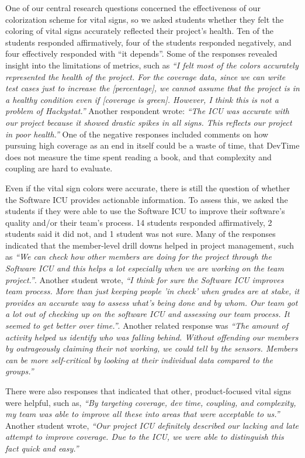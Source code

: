 \documentclass[times,10pt,twocolumn]{article}
\begin{document}
One of our central research questions concerned the effectiveness of our
colorization scheme for vital signs, so we asked students whether they felt
the coloring of vital signs accurately reflected their project's health.
Ten of the students responded affirmatively, four of the students responded
negatively, and four effectively responded with ``it depends''.  Some of
the responses revealed insight into the limitations of metrics, such as
{\em ``I felt most of the colors accurately represented the health of the
project. For the coverage data, since we can write test cases just to
increase the [percentage], we cannot assume that the project is in a
healthy condition even if [coverage is green]. However, I think this is not
a problem of Hackystat.''}  Another respondent wrote: {\em ``The ICU was
accurate with our project because it showed drastic spikes in all signs.
This reflects our project in poor health.''}  One of the negative responses
included comments on how pursuing high coverage as an end in itself could
be a waste of time, that DevTime does not measure the time spent reading a
book, and that complexity and coupling are hard to evaluate.

Even if the vital sign colors were accurate, there is still the question of
whether the Software ICU provides actionable information. To assess this,
we asked the students if they were able to use the Software ICU to improve
their software's quality and/or their team's process.  14 students
responded affirmatively, 2 students said it did not, and 1 student was not
sure.  Many of the responses indicated that the member-level drill downs
helped in project management, such as {\em ``We can check how other members
are doing for the project through the Software ICU and this helps a lot
especially when we are working on the team project.''}.  Another student
wrote, {\em ``I think for sure the Software ICU improves team process. More
than just keeping people 'in check' when grades are at stake, it
provides an accurate way to assess what's being done and by whom. Our team
got a lot out of checking up on the software ICU and assessing our team
process. It seemed to get better over time.''}.  Another related response
was {\em ``The amount of activity helped us identify who was falling
behind. Without offending our members by outrageously claiming their not
working, we could tell by the sensors. Members can be more self-critical by
looking at their individual data compared to the groups.''}

There were also responses that indicated that other, product-focused vital
signs were helpful, such as, {\em ``By targeting coverage, dev time,
coupling, and complexity, my team was able to improve all these into areas
that were acceptable to us.''}  Another student wrote, {\em ``Our project
ICU definitely described our lacking and late attempt to improve
coverage. Due to the ICU, we were able to distinguish this fact quick and
easy.''}
\end{document}
